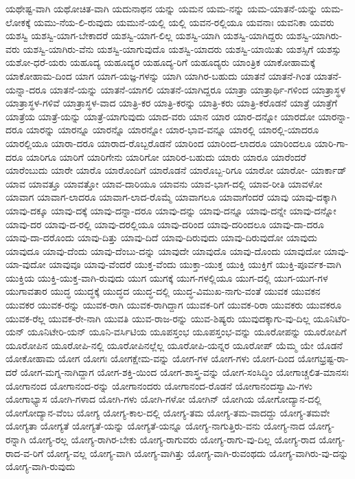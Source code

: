 {ಯಥೇಷ್ಟ-ವಾಗಿ
ಯಥೋಚಿತ-ವಾಗಿ
ಯದುನಾಥನ
ಯನ್ನು
ಯಮನ
ಯಮ-ನನ್ನು
ಯಮ-ಯಾತನೆ-ಯನ್ನು
ಯಮ-ಲೋಕಕ್ಕೆ
ಯಮು-ನೆಯ-ಲಿ-ರುವುದು
ಯಮುನೆ-ಯಲ್ಲಿ
ಯಲ್ಲಿ
ಯವನ-ರಲ್ಲಿಯೂ
ಯವನಾಃ
ಯವನಿಕಾ
ಯವರು
ಯಶಸ್ವಿ
ಯಶಸ್ವಿ-ಯಾಗ-ಬೇಕಾದರೆ
ಯಶಸ್ವಿ-ಯಾಗ-ಲಿಲ್ಲ
ಯಶಸ್ವಿ-ಯಾಗಿ
ಯಶಸ್ವಿ-ಯಾಗಿದ್ದರು
ಯಶಸ್ವಿ-ಯಾಗಿರು-ವರು
ಯಶಸ್ವಿ-ಯಾಗಿರು-ವೆನು
ಯಶಸ್ವಿ-ಯಾಗುವುದೊ
ಯಶಸ್ವಿ-ಯಾದರು
ಯಶಸ್ವಿ-ಯಾಯಿತು
ಯಶಸ್ಸಿಗೆ
ಯಶಸ್ಸು
ಯಶೋ-ಧರೆ-ಯರು
ಯಹೂದ್ಯ
ಯಹೂದ್ಯರ
ಯಹೂದ್ಯ-ರಿಗೆ
ಯಹೂದ್ಯರು
ಯಾಂತ್ರಿಕ
ಯಾಕೋಹಾಮಕ್ಕೆ
ಯಾಕೋಹಾಮ-ದಿಂದ
ಯಾಗ
ಯಾಗ-ಯಜ್ಞ-ಗಳನ್ನು
ಯಾಗಿ
ಯಾಗಿರ-ಬಹುದು
ಯಾತನೆ
ಯಾತನೆ-ಗಿಂತ
ಯಾತನೆ-ಯನ್ನಾ-ದರೂ
ಯಾತನೆ-ಯನ್ನು
ಯಾತನೆ-ಯಾಗಲಿ
ಯಾತನೆ-ಯಾಗಿದ್ದರೂ
ಯಾತ್ರಾ
ಯಾತ್ರಾರ್ಥಿ-ಗಳಿಂದ
ಯಾತ್ರಾಸ್ಥಳ
ಯಾತ್ರಾಸ್ಥಳ-ಗಳಿವೆ
ಯಾತ್ರಾಸ್ಥಳ-ವಾದ
ಯಾತ್ರಿ-ಕರ
ಯಾತ್ರಿ-ಕರನ್ನು
ಯಾತ್ರಿ-ಕರು
ಯಾತ್ರಿ-ಕರೊಡನೆ
ಯಾತ್ರೆ
ಯಾತ್ರೆಗೆ
ಯಾತ್ರೆಯ
ಯಾತ್ರೆ-ಯನ್ನು
ಯಾತ್ರೆ-ಯಾಗುವುದು
ಯಾದ-ವರು
ಯಾನ
ಯಾರ
ಯಾರ-ದನ್ನೋ
ಯಾರದೋ
ಯಾರನ್ನಾ-ದರೂ
ಯಾರನ್ನು
ಯಾರನ್ನೂ
ಯಾರನ್ನೊ
ಯಾರನ್ನೋ
ಯಾರ-ಭಾವ-ವನ್ನೂ
ಯಾರಲ್ಲಿ
ಯಾರಲ್ಲಿ-ಯಾದರೂ
ಯಾರಲ್ಲಿಯೂ
ಯಾರಾ-ದರೂ
ಯಾರಾದ-ರೊಬ್ಬರೊಡನೆ
ಯಾರಿಂದ
ಯಾರಿಂದ-ಲಾದರೂ
ಯಾರಿಂದಲೂ
ಯಾರಿ-ಗಾ-ದರೂ
ಯಾರಿಗೂ
ಯಾರಿಗೆ
ಯಾರಿಗೇನು
ಯಾರಿಗೋ
ಯಾರಿರ-ಬಹುದು
ಯಾರು
ಯಾರೂ
ಯಾರೆಂದರೆ
ಯಾರೆಂಬುದು
ಯಾರೇ
ಯಾರೊ
ಯಾರೊಂದಿಗೆ
ಯಾರೊಡನೆ
ಯಾರೊಬ್ಬ-ರಿಗೂ
ಯಾರೋ
ಯಾರೋ-
ಯಾರ್ಕಾಡ್
ಯಾವ
ಯಾವತ್ತೂ
ಯಾವತ್ತೋ
ಯಾವ-ದಾರಿಯೂ
ಯಾವನು
ಯಾವ-ಭಾಗ-ದಲ್ಲಿ
ಯಾವ-ರೀತಿ
ಯಾವಳೋ
ಯಾವಾಗ
ಯಾವಾಗ-ಲಾದರೂ
ಯಾವಾಗ-ಲಾದ-ರೊಮ್ಮೆ
ಯಾವಾಗಲೂ
ಯಾವಾಗೆಂದರೆ
ಯಾವು
ಯಾವು-ದಕ್ಕಾಗಿ
ಯಾವು-ದಕ್ಕೂ
ಯಾವು-ದಕ್ಕೆ
ಯಾವು-ದನ್ನಾ-ದರೂ
ಯಾವು-ದನ್ನು
ಯಾವು-ದನ್ನೂ
ಯಾವು-ದನ್ನೇ
ಯಾವು-ದನ್ನೋ
ಯಾವು-ದರ
ಯಾವು-ದ-ರಲ್ಲಿ
ಯಾವು-ದರಲ್ಲಿಯೂ
ಯಾವು-ದರಿಂದ
ಯಾವು-ದರಿಂದಲೂ
ಯಾವು-ದಾ-ದರೂ
ಯಾವು-ದಾ-ದರೊಂದು
ಯಾವು-ದಿತ್ತು
ಯಾವು-ದಿದೆ
ಯಾವು-ದಿರುವುದು
ಯಾವು-ದಿರುವುದೋ
ಯಾವುದು
ಯಾವುದೂ
ಯಾವು-ದೆಂದು
ಯಾವು-ದೆಂಬು-ದನ್ನು
ಯಾವುದೇ
ಯಾವುದೊ
ಯಾವು-ದೊಂದು
ಯಾವುದೋ
ಯಾವು-ಯಾ-ವುದೋ
ಯಾವುವೂ
ಯಾವು-ವೆಂದರೆ
ಯುಕ್ತ-ವೆಂದು
ಯುಕ್ತಾ-ಯುಕ್ತ
ಯುಕ್ತಿ
ಯುಕ್ತಿಗೆ
ಯುಕ್ತಿ-ಪೂರ್ವಕ-ವಾಗಿ
ಯುಕ್ತಿಯ
ಯುಕ್ತಿ-ಯುಕ್ತ-ವಾಗಿ-ರುವುದು
ಯುಗ
ಯುಗಕ್ಕೆ
ಯುಗ-ಗಳಲ್ಲಿಯೂ
ಯುಗ-ದಲ್ಲಿ
ಯುಗ-ಯುಗ-ಗಳ
ಯುಗಾವತಾರ
ಯುದ್ಧ
ಯುದ್ಧಕ್ಕೆ
ಯುದ್ಧದ
ಯುದ್ಧ-ದಲ್ಲಿ
ಯುದ್ಧ-ವಿಮುಖ-ನಾಗು-ವಂತೆ
ಯುವಕ
ಯುವಕನ
ಯುವಕರ
ಯುವಕ-ರನ್ನು
ಯುವಕ-ರಾಗಿ
ಯುವಕ-ರಾಗಿದ್ದಾಗ
ಯುವಕ-ರಿಗೆ
ಯುವಕ-ರಿರಾ
ಯುವಕರು
ಯುವಕರೂ
ಯುವಕ-ರೆಲ್ಲ
ಯುವಕ-ರೇ-ನಾಗಿ
ಯುವತಿ
ಯುವ-ರಾಜ-ರನ್ನು
ಯುವ-ಶಿಷ್ಯರು
ಯುವುದಕ್ಕಾಗು-ವು-ದಿಲ್ಲ
ಯೂನಿಟೆರಿ-ಯನ್
ಯೂನಿಟೇರಿ-ಯನ್
ಯೂನಿ-ವರ್ಸಿಟಿಯ
ಯೂಪಸ್ತಂಭ
ಯೂಪಸ್ತಂಭ-ವನ್ನು
ಯೂರೋಪನ್ನು
ಯೂರೋಪಿಗೆ
ಯೂರೋಪಿನ
ಯೂರೋಪಿ-ನಲ್ಲಿ
ಯೂರೋಪಿನಲ್ಲೆಲ್ಲ
ಯೂರೋಪಿ-ಯನ್ನರ
ಯೂರೋಪ್
ಯೆಮ್ಮ
ಯೇ
ಯೊಡನೆ
ಯೋಕೋಹಾಮ
ಯೋಗ
ಯೋಗಃ
ಯೋಗಕ್ಷೇಮ-ವನ್ನು
ಯೋಗ-ಗಳ
ಯೋಗ-ಗಳು
ಯೋಗ-ದಿಂದ
ಯೋಗಭ್ರಷ್ಟ-ರಾ-ದರೆ
ಯೋಗ-ಮಗ್ನ-ನಾಗಿದ್ದಾಗ
ಯೋಗ-ಶಕ್ತಿ-ಯಿಂದ
ಯೋಗ-ಶಾಸ್ತ್ರ-ವನ್ನು
ಯೋಗ-ಸಂಸಿದ್ಧಿಂ
ಯೋಗಾಚ್ಚಲಿತ-ಮಾನಸಃ
ಯೋಗಾನಂದ
ಯೋಗಾನಂದ-ರನ್ನು
ಯೋಗಾನಂದರು
ಯೋಗಾನಂದ-ರೊಡನೆ
ಯೋಗಾನಂದಸ್ವಾಮಿ-ಗಳು
ಯೋಗಾಭ್ಯಾಸ
ಯೋಗಿ-ಗಳಾದ
ಯೋಗಿ-ಗಳು
ಯೋಗಿ-ಗಳೋ
ಯೋಗಿನ್
ಯೋಗಿಯ
ಯೋಗೋದ್ಯಾನ-ದಲ್ಲಿ
ಯೋಗೋದ್ಯಾನ-ವೆಂಬ
ಯೋಗ್ಯ
ಯೋಗ್ಯ-ಕಾಲ-ದಲ್ಲಿ
ಯೋಗ್ಯ-ತಮ
ಯೋಗ್ಯ-ತಮ-ವಾದದ್ದು
ಯೋಗ್ಯ-ತಮವೇ
ಯೋಗ್ಯತಾ
ಯೋಗ್ಯತೆ
ಯೋಗ್ಯತೆ-ಯನ್ನು
ಯೋಗ್ಯತೆ-ಯನ್ನೂ
ಯೋಗ್ಯ-ನಾಗುತ್ತಿರು-ವನು
ಯೋಗ್ಯ-ನಾದ
ಯೋಗ್ಯ-ರನ್ನಾಗಿ
ಯೋಗ್ಯ-ರಲ್ಲ
ಯೋಗ್ಯ-ರಾಗಿರ-ಬೇಕು
ಯೋಗ್ಯ-ರಾಗುವರು
ಯೋಗ್ಯ-ರಾಗು-ವು-ದಿಲ್ಲ
ಯೋಗ್ಯ-ರಾದ
ಯೋಗ್ಯ-ರಾದ-ವ-ರಿಗೆ
ಯೋಗ್ಯ-ವಲ್ಲ
ಯೋಗ್ಯ-ವಾಗಿ
ಯೋಗ್ಯ-ವಾಗಿತ್ತು
ಯೋಗ್ಯ-ವಾಗಿ-ರುವಂಥದು
ಯೋಗ್ಯ-ವಾಗಿರು-ವು-ದನ್ನು
ಯೋಗ್ಯ-ವಾಗಿ-ರುವುದು
}
